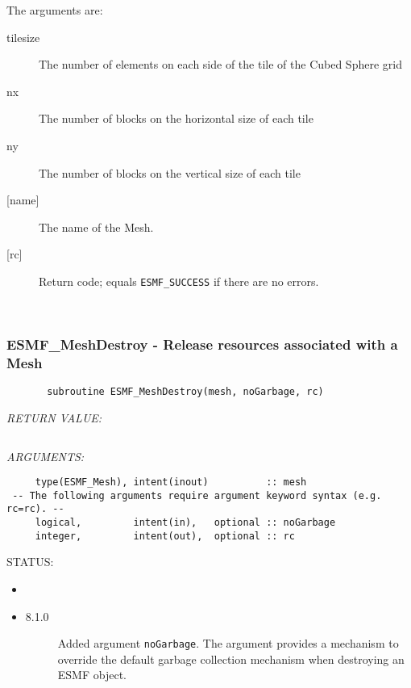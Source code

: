   
       The arguments are:
       \begin{description}
       \item[tilesize]
            The number of elements on each side of the tile of the Cubed Sphere grid
       \item[nx]
            The number of blocks on the horizontal size of each tile
       \item[ny]
            The number of blocks on the vertical size of each tile
     \item [{[name]}]
           The name of the Mesh.
       \item[{[rc]}]
            Return code; equals {\tt ESMF\_SUCCESS} if there are no errors.
       \end{description}
   
 
\mbox{}\hrulefill\ 
 
\subsubsection [ESMF\_MeshDestroy] {ESMF\_MeshDestroy - Release resources associated with a Mesh}


  
\begin{verbatim}       subroutine ESMF_MeshDestroy(mesh, noGarbage, rc)\end{verbatim}{\em RETURN VALUE:}
\begin{verbatim} \end{verbatim}{\em ARGUMENTS:}
\begin{verbatim}     type(ESMF_Mesh), intent(inout)          :: mesh
 -- The following arguments require argument keyword syntax (e.g. rc=rc). --
     logical,         intent(in),   optional :: noGarbage
     integer,         intent(out),  optional :: rc\end{verbatim}
{\sf STATUS:}
   \begin{itemize}
   \item{}
   \item{}
   \begin{description}
   \item[8.1.0] Added argument {\tt noGarbage}.
     The argument provides a mechanism to override the default garbage collection
     mechanism when destroying an ESMF object.
   \end{description}
   \end{itemize}
  
